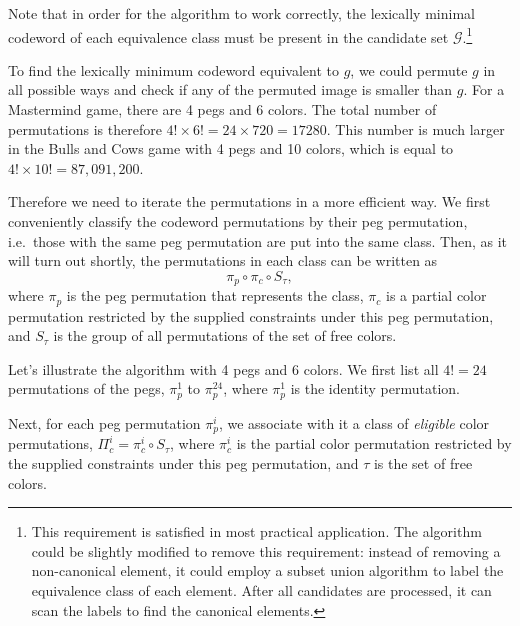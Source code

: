 Note that in order for the algorithm to work correctly, the lexically minimal codeword of each equivalence class must be present in the candidate set $\mathcal{G}$.\footnote{
This requirement is satisfied in most practical application. The algorithm could be slightly modified to remove this requirement: instead of removing a non-canonical element, it could employ a subset union algorithm to label the equivalence class of each element. After all candidates are processed, it can scan the labels to find the canonical elements.
}


To find the lexically minimum codeword equivalent to $g$, we could permute $g$ in all possible ways and check if any of the permuted image is smaller than $g$. For a Mastermind game, there are 4 pegs and 6 colors. The total number of permutations is therefore $4! \times 6! = 24 \times 720 = 17280$. This number is much larger in the Bulls and Cows game with 4 pegs and 10 colors, which is equal to $4! \times 10! = 87,091,200$.

Therefore we need to iterate the permutations in a more efficient way. We first conveniently classify the codeword permutations by their peg permutation, i.e.\ those with the same peg permutation are put into the same class. Then, as it will turn out shortly, the permutations in each class can be written as
\[
\pi_p \circ \pi_c \circ S_\tau ,
\]
where $\pi_p$ is the peg permutation that represents the class, $\pi_c$ is a partial color permutation restricted by the supplied constraints under this peg permutation, and $S_\tau$ is the group of all permutations of the set of free colors.


Let's illustrate the algorithm with 4 pegs and 6 colors. We first list all $4! = 24$ permutations of the pegs, $\pi_p^1$ to $\pi_p^{24}$, where $\pi_p^1$ is the identity permutation.

Next, for each peg permutation $\pi_p^i$, we associate with it a class of \emph{eligible} color permutations, $\Pi_c^i = \pi_c^i \circ S_\tau$, where $\pi_c^i$ is the partial color permutation restricted by the supplied constraints under this peg permutation, and $\tau$ is the set of free colors. 

